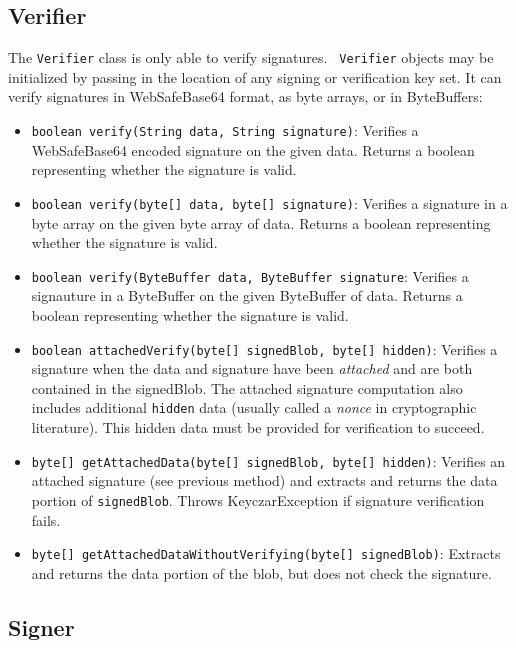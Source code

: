 \documentclass{llncs}
\begin{document}
\subsection{Verifier}

The {\tt Verifier} class is only able to verify signatures. {\tt
  Verifier} objects may be initialized by passing in the location of
any signing or verification key set.  It can verify signatures in
WebSafeBase64 format, as byte arrays, or in ByteBuffers:

\begin{itemize}

\item {\tt boolean verify(String data, String signature)}: Verifies a
  WebSafeBase64 encoded signature on the given data. Returns a boolean
  representing whether the signature is valid.

\item {\tt boolean verify(byte[] data, byte[] signature)}: Verifies a
  signature in a byte array on the given byte array of data. Returns a
  boolean representing whether the signature is valid.

\item {\tt boolean verify(ByteBuffer data, ByteBuffer signature}:
  Verifies a signauture in a ByteBuffer on the given ByteBuffer of
  data. Returns a boolean representing whether the signature is valid.

\item {\tt boolean attachedVerify(byte[] signedBlob, byte[] hidden)}:
  Verifies a signature when the data and signature have been {\it
    attached} and are both contained in the signedBlob.  The attached
  signature computation also includes additional {\tt hidden} data
  (usually called a {\it nonce} in cryptographic literature).  This
  hidden data must be provided for verification to succeed.

\item {\tt byte[] getAttachedData(byte[] signedBlob, byte[] hidden)}:
  Verifies an attached signature (see previous method) and extracts
  and returns the data portion of {\tt signedBlob}.  Throws
  KeyczarException if signature verification fails.

\item {\tt byte[] getAttachedDataWithoutVerifying(byte[] signedBlob)}:
  Extracts and returns the data portion of the blob, but does not
  check the signature.
\end{itemize}

\subsection{Signer}
\end{document}
